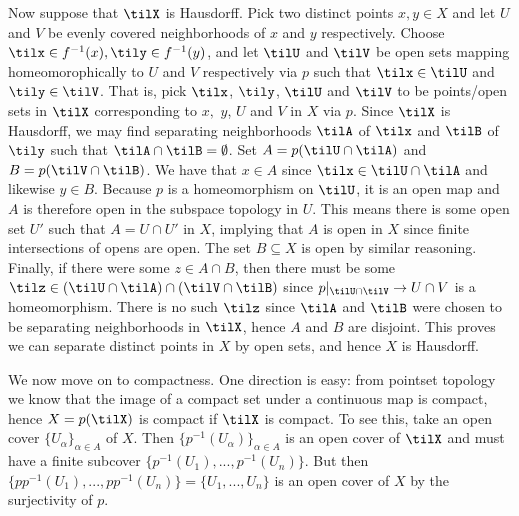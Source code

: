 \begin{homework}[e]
\begin{prf}
    Now suppose that $\tilX$ is Hausdorff. Pick two distinct points $x,y\in X$ and let $U$ and $V$ be evenly covered neighborhoods of $x$ and $y$ respectively. Choose $\tilx \in f^{-1}(x), \tily \in f^{-1}(y)$, and let $\tilU$ and $\tilV$ be open sets mapping homeomorophically to $U$ and $V$ respectively via $p$ such that $\tilx \in \tilU$ and $\tily \in \tilV$. That is, pick $\tilx$, $\tily$, $\tilU$ and $\tilV$ to be points/open sets in $\tilX$ corresponding to $x,$ $y$, $U$ and $V$ in $X$ via $p$. Since $\tilX$ is Hausdorff, we may find separating neighborhoods $\tilA$ of $\tilx$ and $\tilB$ of $\tily$ such that $\tilA \cap \tilB = \emptyset$. Set $A = p(\tilU \cap \tilA)$ and $B = p(\tilV\cap \tilB)$. We have that $x \in A$ since $\tilx \in \tilU \cap \tilA$ and likewise $y \in B$. Because $p$ is a homeomorphism on $\tilU$, it is an open map and $A$ is therefore open in the subspace topology in $U$. This means there is some open set $U'$ such that $A = U\cap U'$ in $X$, implying that $A$ is open in $X$ since finite intersections of opens are open. The set $B\subseteq X$  is open by similar reasoning. Finally, if there were some $z \in A\cap B$, then there must be some $\tilz \in (\tilU \cap \tilA) \cap (\tilV \cap \tilB)$ since $p|_{\tilU \cap \tilV} \to U\cap V$ is a homeomorphism. There is no such $\tilz$ since $\tilA$ and $\tilB$ were chosen to be separating neighborhoods in $\tilX$, hence $A$ and $B$ are disjoint. This proves we can separate distinct points in $X$ by open sets, and hence $X$ is Hausdorff.

    \bigskip

    We now move on to compactness. One direction is easy: from pointset topology we know that the image of a compact set under a continuous map is compact, hence $X = p(\tilX)$ is compact if $\tilX$ is compact. To see this, take an open cover $\{U_\alpha\}_{\alpha \in A}$ of $X$. Then $\{p^{-1}(U_\alpha)\}_{\alpha \in A}$ is an open cover of $\tilX$ and must have a finite subcover $\{p^{-1}(U_1),...,p^{-1}(U_n)\}$. But then $\{pp^{-1}(U_1),...,pp^{-1}(U_n)\} = \{U_1,...,U_n\}$ is an open cover of $X$ by the surjectivity of $p$.


\end{prf}
\end{homework}
